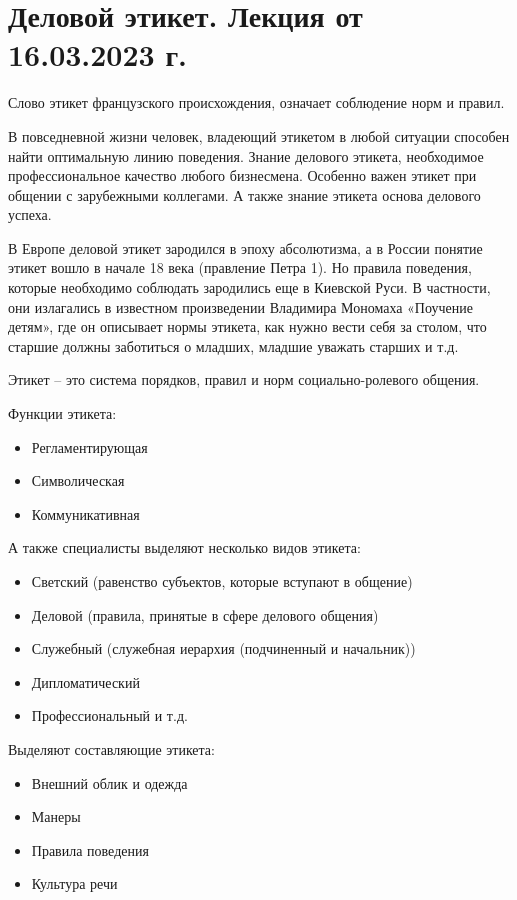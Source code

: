 \section{Деловой этикет. Лекция от 16.03.2023 г.}

Слово этикет французского происхождения, означает соблюдение норм и правил.

В повседневной жизни человек, владеющий этикетом в любой ситуации способен найти оптимальную линию поведения. Знание делового этикета, необходимое профессиональное качество любого бизнесмена. 
Особенно важен этикет при общении с зарубежными коллегами. А также знание этикета основа делового успеха.

В Европе деловой этикет зародился в эпоху абсолютизма, а в России понятие этикет вошло в начале 18 века (правление Петра 1). Но правила поведения, которые необходимо соблюдать зародились еще в Киевской Руси. В частности, они излагались в известном произведении Владимира Мономаха «Поучение детям», где он описывает нормы этикета, как нужно вести себя за столом, что старшие должны заботиться о младших, младшие уважать старших и т.д.

Этикет – это система порядков, правил и норм социально-ролевого общения.

Функции этикета:
\begin{itemize}
\item Регламентирующая 
\item Символическая
\item Коммуникативная
\end{itemize}

А также специалисты выделяют несколько видов этикета:
\begin{itemize}
\item Светский (равенство субъектов, которые вступают в общение)
\item Деловой (правила, принятые в сфере делового общения)
\item Служебный (служебная иерархия (подчиненный и начальник))
\item Дипломатический
\item Профессиональный и т.д. 
\end{itemize}

Выделяют составляющие этикета:
\begin{itemize}
\item Внешний облик и одежда
\item Манеры 
\item Правила поведения
\item Культура речи
\end{itemize}

